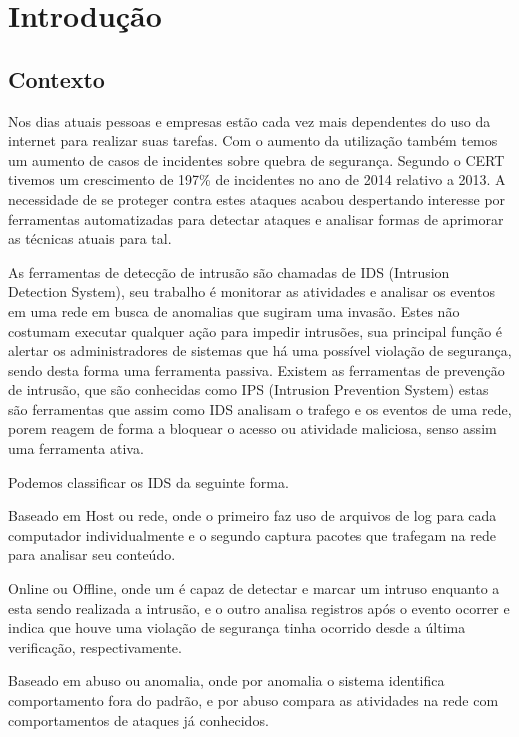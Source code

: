 \documentclass[
	12pt,				%
	openright,			%
	oneside,
	a4paper,			%
	english,			%
	french,				%
	spanish,			%
	brazil				%
	]{abntex2}
\begin{document}
\chapter[Introdução]{Introdução}

\section{Contexto}

Nos dias atuais pessoas e empresas estão cada vez mais dependentes do uso da internet para realizar suas tarefas. Com o aumento da utilização também temos um aumento de casos de incidentes sobre quebra de segurança. Segundo o CERT \cite{CERT} tivemos um crescimento de 197\% de incidentes no ano de 2014 relativo a 2013. A necessidade de se proteger contra estes
ataques acabou despertando interesse por ferramentas automatizadas para detectar ataques e analisar formas de aprimorar as técnicas atuais para tal.

As ferramentas de detecção de intrusão são chamadas de IDS (Intrusion Detection System), seu trabalho é monitorar as atividades e analisar os eventos em uma rede em busca de anomalias que sugiram uma invasão. Estes não costumam executar qualquer ação para impedir intrusões, sua principal função é alertar os administradores de sistemas que há uma possível violação de segurança, sendo desta forma uma ferramenta passiva.
Existem as ferramentas de prevenção de intrusão, que são conhecidas como IPS (Intrusion Prevention System) estas são ferramentas que assim como IDS analisam o trafego e os eventos de uma rede, porem reagem de forma a bloquear o acesso ou atividade maliciosa, senso assim uma ferramenta ativa.

Podemos classificar os IDS da seguinte forma.

Baseado em Host ou rede, onde o primeiro faz uso de arquivos de log para cada computador individualmente e o segundo captura pacotes que trafegam na rede para analisar seu conteúdo.

Online ou Offline, onde um é capaz de detectar e marcar um intruso enquanto a esta sendo realizada a intrusão, e o outro analisa registros após o evento ocorrer e indica que houve uma violação de segurança tinha ocorrido desde a última verificação, respectivamente.

Baseado em abuso ou anomalia, onde por anomalia o sistema identifica comportamento fora do padrão, e por abuso compara as atividades na rede com comportamentos de ataques já conhecidos.
\end{document}
